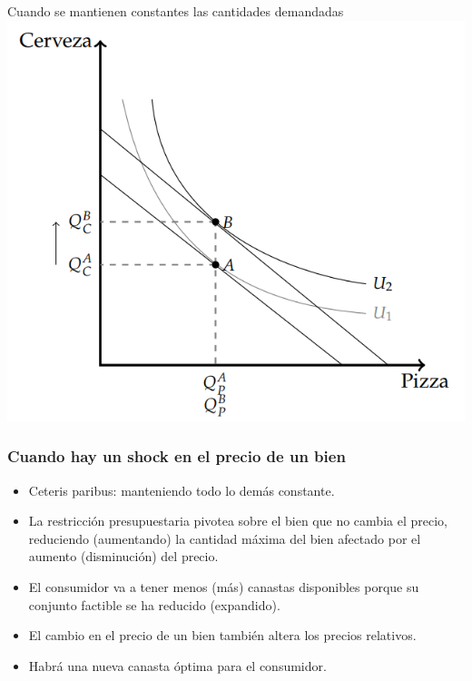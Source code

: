 \documentclass{beamer}
\begin{document}
\begin{frame}{Cuando se mantienen constantes las cantidades demandadas}
    \centering
    \includegraphics[scale=0.5]{../Figures/C.8.6.png}
\end{frame}

\begin{frame}
\frametitle{Cuando hay un shock en el precio de un bien}
\begin{itemize}
    \item Ceteris paribus: manteniendo todo lo demás constante.
    \item La restricción presupuestaria pivotea sobre el bien que no cambia el precio, reduciendo (aumentando) la cantidad máxima del bien afectado por el aumento (disminución) del precio.  
    \item El consumidor va a tener menos (más) canastas disponibles porque su conjunto factible se ha reducido (expandido).
    \item El cambio en el precio de un bien también altera los precios relativos. 
    \item Habrá una nueva canasta óptima para el consumidor.
\end{itemize}
\end{frame}
\end{document}
